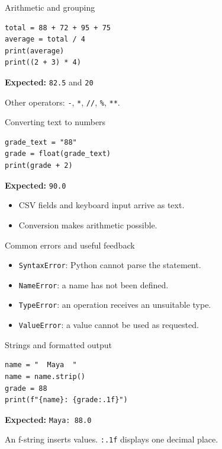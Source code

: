 \documentclass[aspectratio=169,12pt]{beamer}
\begin{document}
\begin{frame}[fragile]{Arithmetic and grouping}
\begin{lstlisting}
total = 88 + 72 + 95 + 75
average = total / 4
print(average)
print((2 + 3) * 4)
\end{lstlisting}
\textbf{Expected:} \texttt{82.5} and \texttt{20}
\par Other operators: \texttt{-}, \texttt{*}, \texttt{//}, \texttt{\%}, \texttt{**}.
\end{frame}
\begin{frame}[fragile]{Converting text to numbers}
\begin{lstlisting}
grade_text = "88"
grade = float(grade_text)
print(grade + 2)
\end{lstlisting}
\textbf{Expected:} \texttt{90.0}
\begin{itemize}
\item CSV fields and keyboard input arrive as text.
\item Conversion makes arithmetic possible.
\end{itemize}

\end{frame}
\begin{frame}[fragile]{Common errors and useful feedback}
\begin{itemize}
\item \texttt{SyntaxError}: Python cannot parse the statement.
\item \texttt{NameError}: a name has not been defined.
\item \texttt{TypeError}: an operation receives an unsuitable type.
\item \texttt{ValueError}: a value cannot be used as requested.
\end{itemize}

\end{frame}
\begin{frame}[fragile]{Strings and formatted output}
\begin{lstlisting}
name = "  Maya  "
name = name.strip()
grade = 88
print(f"{name}: {grade:.1f}")
\end{lstlisting}
\textbf{Expected:} \texttt{Maya: 88.0}
\par An f-string inserts values. \texttt{:.1f} displays one decimal place.
\end{frame}
\end{document}
